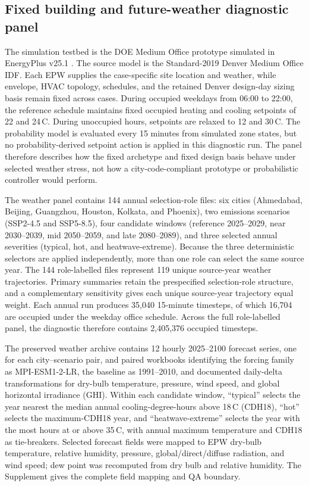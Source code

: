 \subsection{Fixed building and future-weather diagnostic panel}

The simulation testbed is the DOE Medium Office prototype \citep{DOE2011ASHRAE90_1Prototypes} simulated in EnergyPlus v25.1 \citep{DOE2024EnergyPlusRef}. The source model is the Standard-2019 Denver Medium Office IDF. Each EPW supplies the case-specific site location and weather, while envelope, HVAC topology, schedules, and the retained Denver design-day sizing basis remain fixed across cases. During occupied weekdays from 06:00 to 22:00, the reference schedule maintains fixed occupied heating and cooling setpoints of 22 and 24\,\degree C. During unoccupied hours, setpoints are relaxed to 12 and 30\,\degree C. The probability model is evaluated every 15 minutes from simulated zone states, but no probability-derived setpoint action is applied in this diagnostic run. The panel therefore describes how the fixed archetype and fixed design basis behave under selected weather stress, not how a city-code-compliant prototype or probabilistic controller would perform.

The weather panel contains 144 annual selection-role files: six cities (Ahmedabad, Beijing, Guangzhou, Houston, Kolkata, and Phoenix), two emissions scenarios (SSP2-4.5 and SSP5-8.5), four candidate windows (reference 2025--2029, near 2030--2039, mid 2050--2059, and late 2080--2089), and three selected annual severities (typical, hot, and heatwave-extreme). Because the three deterministic selectors are applied independently, more than one role can select the same source year. The 144 role-labelled files represent 119 unique source-year weather trajectories. Primary summaries retain the prespecified selection-role structure, and a complementary sensitivity gives each unique source-year trajectory equal weight. Each annual run produces 35{,}040 15-minute timesteps, of which 16{,}704 are occupied under the weekday office schedule. Across the full role-labelled panel, the diagnostic therefore contains 2{,}405{,}376 occupied timesteps.

The preserved weather archive contains 12 hourly 2025--2100 forecast series, one for each city--scenario pair, and paired workbooks identifying the forcing family as MPI-ESM1-2-LR, the baseline as 1991--2010, and documented daily-delta transformations for dry-bulb temperature, pressure, wind speed, and global horizontal irradiance (GHI). Within each candidate window, ``typical'' selects the year nearest the median annual cooling-degree-hours above 18\,\degree C (CDH18), ``hot'' selects the maximum-CDH18 year, and ``heatwave-extreme'' selects the year with the most hours at or above 35\,\degree C, with annual maximum temperature and CDH18 as tie-breakers. Selected forecast fields were mapped to EPW dry-bulb temperature, relative humidity, pressure, global/direct/diffuse radiation, and wind speed; dew point was recomputed from dry bulb and relative humidity. The Supplement gives the complete field mapping and QA boundary.

